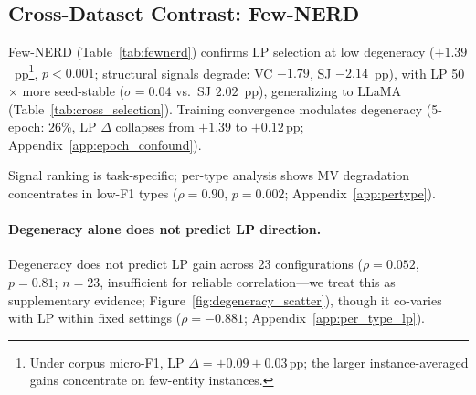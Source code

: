 \subsection{Cross-Dataset Contrast: Few-NERD}\label{sec:fewnerd}

\begin{table}[t]
\centering
\small
\caption{LP selection across datasets (instance-averaged F1; Qwen3-8B, $N{=}8$, $T{=}1.0$, gold-filtered, 3-seed means). $p$: paired bootstrap.}
\label{tab:fewnerd}
\end{table}

Few-NERD (Table~\ref{tab:fewnerd}) confirms LP selection at low degeneracy ($+1.39$~pp\footnote{Under corpus micro-F1, LP $\Delta{=}+0.09{\pm}0.03$\,pp; the larger instance-averaged gains concentrate on few-entity instances.}, $p{<}0.001$; structural signals degrade: VC $-1.79$, SJ $-2.14$~pp), with LP 50$\times$ more seed-stable ($\sigma{=}0.04$ vs.\ SJ $2.02$~pp), generalizing to LLaMA (Table~\ref{tab:cross_selection}). Training convergence modulates degeneracy (5-epoch: $26$\%, LP $\Delta$ collapses from $+1.39$ to $+0.12$\,pp; Appendix~\ref{app:epoch_confound}).

Signal ranking is task-specific; per-type analysis shows MV degradation concentrates in low-F1 types ($\rho{=}0.90$, $p{=}0.002$; Appendix~\ref{app:pertype}).

\paragraph{Degeneracy alone does not predict LP direction.}
Degeneracy does not predict LP gain across 23 configurations ($\rho{=}0.052$, $p{=}0.81$; $n{=}23$, insufficient for reliable correlation---we treat this as supplementary evidence; Figure~\ref{fig:degeneracy_scatter}), though it co-varies with LP within fixed settings ($\rho{=}{-}0.881$; Appendix~\ref{app:per_type_lp}).

